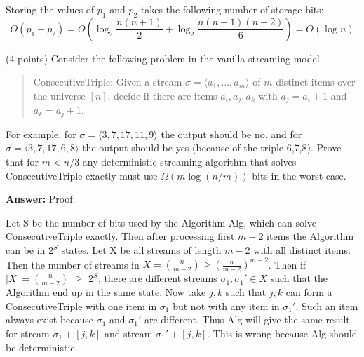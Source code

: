 \documentclass{article}
\renewcommand{\geq}{\geqslant}
\newcommand{\alg}{{\sc Alg}\xspace}
\newcounter{rcounter}
\newenvironment{rlist}%
{\begin{list}{\setnr-\arabic{rcounter}}{\usecounter{rcounter}}}{\end{list}}
\begin{document}
\begin{rlist}
        Storing the values of $p_1$ and $p_2$ takes the following number of storage bits:
        $$O(p_1+p_2) = O(\log_2 \frac{n(n+1)}{2} + \log_2 \frac{n(n+1)(n+2)}{6}) = O(\log n)$$
        
        
        
        \item (4 points)      
        Consider the following problem in the vanilla streaming model.
        \begin{quotation}\noindent
            {\sc ConsecutiveTriple}: Given a stream $\sigma=\langle a_1,\ldots,a_m\rangle$ of
            $m$ distinct items over the universe $[n]$, decide if there are items
            $a_i,a_j,a_k$ with $a_j=a_i+1$ and $a_k=a_j+1$.
        \end{quotation}
        For example, for $\sigma=\langle 3,7,17,11,9\rangle$ the output should be {\sc no},
        and for $\sigma=\langle 3,7,17,6,8\rangle$ the output should be {\sc yes} (because
        of the triple 6,7,8).
        Prove that for $m<n/3$ any deterministic streaming algorithm that solves
        {\sc ConsecutiveTriple} exactly must use $\Omega(m\log(n/m))$ bits in the worst case. 
        
        \textbf{Answer:}
        Proof:
        
        Let S be the number of bits used by the Algorithm \alg, which can solve {\sc ConsecutiveTriple} exactly.
        Then after processing first $m-2$ items the Algorithm can be in $2^S$ states. Let X be all streams of length $m-2$ with all distinct items. Then the number of streams in $X = \binom{n}{m-2} \geq (\frac{n}{m-2})^{m-2}$.
        Then if $|X| = \binom{n}{m-2}$ $\geq$ $2^S$, there are different streams $\sigma_1, \sigma_1\prime \in X$ such that the Algorithm end up in the same state. Now take $j,k$ such that $j,k$ can form a {\sc ConsecutiveTriple} with one item in $\sigma_1$ but not with any item in $\sigma_1\prime$. Such an item always exist because $\sigma_1$ and $\sigma_1\prime$ are different. Thus \alg will give the same result for stream $\sigma_1+[j,k]$ and stream $\sigma_1\prime+[j,k]$. This is wrong because \alg should be deterministic.
        

\end{rlist}
\end{document}
